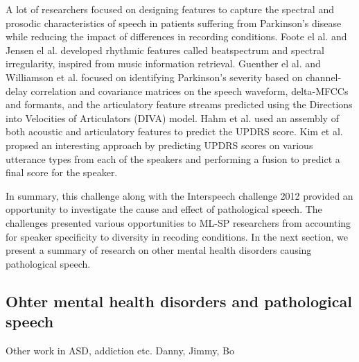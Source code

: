 \documentclass{article}
\begin{document}
A lot of researchers focused on designing features to capture the spectral and prosodic characteristics of speech in patients suffering from Parkinson's disease while reducing the impact of differences in recording conditions.
Foote el al. \cite{foote2002audio} and Jensen el al. \cite{jensen1999timbre} developed rhythmic features called beatspectrum and spectral irregularity, inspired from music information retrieval.
Guenther el al. \cite{guenther2006neural} and Williamson et al. \cite{williamson2015segment} focused on identifying Parkinson's severity based on channel-delay correlation and covariance matrices on the speech waveform, delta-MFCCs and formants, and the articulatory feature streams predicted using the Directions into Velocities of Articulators (DIVA) model.
Hahm et al. \cite{hahm2015parkinson} used an assembly of both acoustic and articulatory features to predict the UPDRS score.
Kim et al. \cite{kim2015automatic} propsed an interesting approach by predicting UPDRS scores on various utterance types from each of the speakers and performing a fusion to predict a final score for the speaker.

In summary, this challenge along with the Interspeech challenge 2012 provided an opportunity to investigate the cause and effect of pathological speech.
The challenges presented various opportunities to ML-SP researchers from accounting for speaker specificity to diversity in recoding conditions.
In the next section, we present a summary of research on other mental health disorders causing pathological speech.

\subsection{ Ohter mental health disorders and pathological speech}

Other work in ASD, addiction etc. 
Danny, Jimmy, Bo
\vfill\pagebreak



\end{document}
